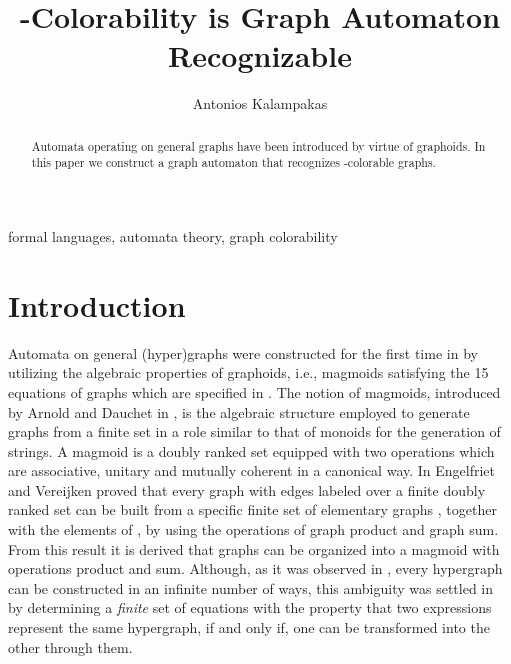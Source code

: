 \documentclass[runningheads,a4paper]{llncs}
\newenvironment{keywords}{
       \list{}{\advance\topsep by0.35cm\relax\small
       \leftmargin=1cm
       \labelwidth=0.35cm
       \listparindent=0.35cm
       \itemindent\listparindent
       \rightmargin\leftmargin}\item[\hskip\labelsep
                                     \bfseries Keywords:]}
     {\endlist}
\begin{document}
\title{-Colorability is Graph Automaton Recognizable}
\author{Antonios Kalampakas}
\maketitle
\begin{abstract}
Automata operating on general graphs have been introduced by virtue of graphoids. In this paper we construct a graph automaton that recognizes -colorable graphs.
\end{abstract}

\begin{keywords}
formal languages, automata theory, graph colorability
\end{keywords}



\section{Introduction}

Automata on general (hyper)graphs were constructed for the first time in \cite{BK3} by utilizing the algebraic properties of graphoids, i.e., magmoids  satisfying the 15 equations of graphs which are specified in \cite{BK1}. The notion of magmoids, introduced by Arnold and Dauchet in \cite{AD}, is the algebraic structure employed to generate graphs from a finite set in a role similar to that of monoids for the generation of strings. A magmoid is a doubly ranked set equipped with two operations which are associative, unitary and mutually coherent in a canonical way. In \cite{EV} Engelfriet and Vereijken proved that every graph with edges labeled  over a finite doubly ranked set  can be built from a specific finite set of elementary graphs , together with the elements of , by using the operations of graph product and graph sum. From this result it is derived that graphs can be organized into a magmoid with operations product and sum. Although, as it was observed in \cite{EV}, every hypergraph can be constructed in an infinite number of ways, this ambiguity was settled in \cite{BK1} by determining a \emph{finite} set of equations  with the property that two expressions represent the same hypergraph, if and only if, one can be transformed into the other
through them.
\end{document}

